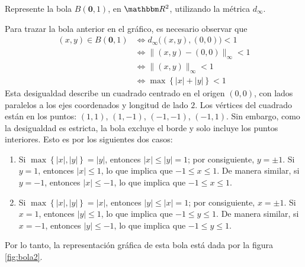\begin{examplebox}{}{}
    Represente la bola $B(\mathbf{0}, 1)$, en $\RR[2]$, utilizando la métrica $d_{\infty}$.

    \tcblower
    \solucion Para trazar la bola anterior en el gráfico, es necesario observar que
    \begin{align*}
        (x, y) \in B(\mathbf{0}, 1) & \Longleftrightarrow d_{\infty} \big( (x, y), (0, 0) \big) < 1 \\
        & \Longleftrightarrow \| (x, y) - (0, 0) \|_{\infty} < 1 \\
        & \Longleftrightarrow \| (x, y) \|_{\infty} < 1 \\
        & \Longleftrightarrow \max \left\{ |x| + |y| \right\} < 1
    \end{align*}
    Esta desigualdad describe un cuadrado centrado en el origen $(0, 0)$, con lados paralelos a los ejes coordenados y longitud de lado $2$. Los vértices del cuadrado están en los puntos: $(1, 1)$, $(1, -1)$, $(-1, -1)$, $(-1, 1)$. Sin embargo, como la desigualdad es estricta, la bola excluye el borde y solo incluye los puntos interiores. Esto es por los siguientes dos casos:
    \begin{enumerate}[label=\roman*), topsep=6pt, itemsep=0pt]
        \item Si $\max \left\{ |x|, |y| \right\} = |y|$, entonces $|x| \leq |y| = 1$; por consiguiente, $y = \pm 1$. Si $y = 1$, entonces $|x| \leq 1$, lo que implica que $-1 \leq x \leq 1$. De manera similar, si $y = -1$, entonces $|x| \leq -1$, lo que implica que $-1 \leq x \leq 1$.
        \item Si $\max \left\{ |x|, |y| \right\} = |x|$, entonces $|y| \leq |x| = 1$; por consiguiente, $x = \pm 1$. Si $x = 1$, entonces $|y| \leq 1$, lo que implica que $-1 \leq y \leq 1$. De manera similar, si $x = -1$, entonces $|y| \leq -1$, lo que implica que $-1 \leq y \leq 1$.
    \end{enumerate}
    Por lo tanto, la representación gráfica de esta bola está dada por la figura \ref{fig:bola2}.
\end{examplebox}

